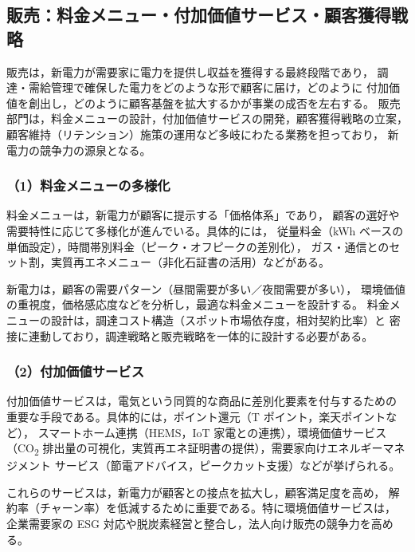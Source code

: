 
\subsection{販売：料金メニュー・付加価値サービス・顧客獲得戦略}

販売は，新電力が需要家に電力を提供し収益を獲得する最終段階であり，
調達・需給管理で確保した電力をどのような形で顧客に届け，どのように
付加価値を創出し，どのように顧客基盤を拡大するかが事業の成否を左右する。
販売部門は，料金メニューの設計，付加価値サービスの開発，顧客獲得戦略の立案，
顧客維持（リテンション）施策の運用など多岐にわたる業務を担っており，
新電力の競争力の源泉となる。

\subsubsection*{\hspace{2em}（1）料金メニューの多様化}

料金メニューは，新電力が顧客に提示する「価格体系」であり，
顧客の選好や需要特性に応じて多様化が進んでいる。具体的には，
従量料金（kWh ベースの単価設定），時間帯別料金（ピーク・オフピークの差別化），
ガス・通信とのセット割，実質再エネメニュー（非化石証書の活用）などがある。

新電力は，顧客の需要パターン（昼間需要が多い／夜間需要が多い），
環境価値の重視度，価格感応度などを分析し，最適な料金メニューを設計する。
料金メニューの設計は，調達コスト構造（スポット市場依存度，相対契約比率）と
密接に連動しており，調達戦略と販売戦略を一体的に設計する必要がある。

\subsubsection*{\hspace{2em}（2）付加価値サービス}

付加価値サービスは，電気という同質的な商品に差別化要素を付与するための
重要な手段である。具体的には，ポイント還元（T ポイント，楽天ポイントなど），
スマートホーム連携（HEMS，IoT 家電との連携），環境価値サービス（CO\textsubscript{2}
排出量の可視化，実質再エネ証明書の提供），需要家向けエネルギーマネジメント
サービス（節電アドバイス，ピークカット支援）などが挙げられる。

これらのサービスは，新電力が顧客との接点を拡大し，顧客満足度を高め，
解約率（チャーン率）を低減するために重要である。特に環境価値サービスは，
企業需要家の ESG 対応や脱炭素経営と整合し，法人向け販売の競争力を高める。

